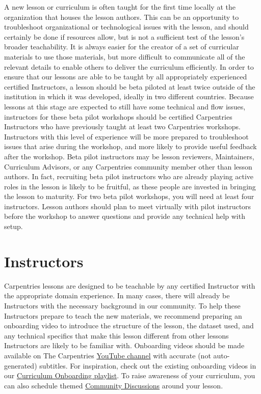 \documentclass[]{book}
\begin{document}
A new lesson or curriculum is often taught for the first time locally at
the organization that houses the lesson authors. This can be an opportunity
to troubleshoot organizational or technological issues with the lesson, and
should certainly be done if resources allow, but is
not a sufficient test of the lesson's broader teachability. It is always easier
for the creator of a set of curricular materials to use those materials, but
more difficult to communicate all of the relevant details to enable
others to deliver the curriculum efficiently. In order to ensure
that our lessons are able to be taught by all appropriately experienced
certified Instructors, a lesson should be beta piloted at least twice outside of the institution
in which it was developed, ideally in two different countries. Because lessons at this stage are
expected to still have some technical and flow issues, instructors for these beta pilot
workshops should be certified Carpentries Instructors who have previously taught at least two
Carpentries workshops. Instructors with this level of experience will be more prepared to troubleshoot
issues that arise during the workshop, and more likely to provide useful feedback after the workshop.
Beta pilot instructors may be lesson reviewers,
Maintainers, Curriculum Advisors, or any Carpentries community member other than
lesson authors. In fact, recruiting beta pilot instructors who are already playing active roles
in the lesson is likely to be fruitful,
as these people are invested in bringing the lesson
to maturity. For two beta pilot workshops, you will need at least four instructors. Lesson
authors should plan to meet virtually with pilot instructors before the workshop to
answer questions and provide any technical help with setup.

\hypertarget{instructors}{%
\section{Instructors}\label{instructors}}

Carpentries lessons are designed to be teachable by any certified Instructor with the
appropriate domain experience. In many cases, there will already be Instructors with
the necessary background in our community. To help these Instructors prepare to teach
the new materials, we recommend preparing an onboarding video to introduce the
structure of the lesson, the dataset used, and any technical specifics that make
this lesson different from other lessons Instructors are likely to be familiar with.
Onboarding videos should be made available on The Carpentries \href{https://www.youtube.com/c/thecarpentries}{YouTube channel}
with accurate (not auto-generated) subtitles. For inspiration,
check out the existing onboarding videos in our \href{https://www.youtube.com/watch?v=zgdutO5tejo\&list=PLXLapl_LKb4e73Vf2e3rS2q2TDJ7oh_DX}{Curriculum Onboarding playlist}. To raise awareness of your curriculum,
you can also schedule themed \href{https://pad.carpentries.org/community-discussions}{Community Discussions} around your lesson.
\end{document}
